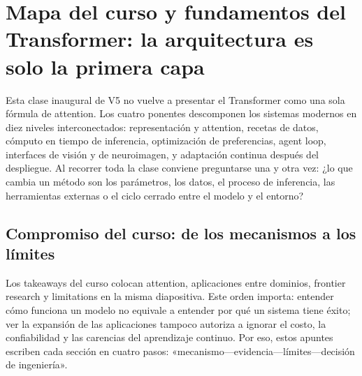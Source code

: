 \section{Mapa del curso y fundamentos del Transformer: la arquitectura es solo la primera capa}

Esta clase inaugural de V5 no vuelve a presentar el Transformer como una sola fórmula de attention. Los cuatro ponentes descomponen los sistemas modernos en diez niveles interconectados: representación y attention, recetas de datos, cómputo en tiempo de inferencia, optimización de preferencias, agent loop, interfaces de visión y de neuroimagen, y adaptación continua después del despliegue. Al recorrer toda la clase conviene preguntarse una y otra vez: ¿lo que cambia un método son los parámetros, los datos, el proceso de inferencia, las herramientas externas o el ciclo cerrado entre el modelo y el entorno?



\subsection{Compromiso del curso: de los mecanismos a los límites}

Los takeaways del curso colocan attention, aplicaciones entre dominios, frontier research y limitations en la misma diapositiva. Este orden importa: entender cómo funciona un modelo no equivale a entender por qué un sistema tiene éxito; ver la expansión de las aplicaciones tampoco autoriza a ignorar el costo, la confiabilidad y las carencias del aprendizaje continuo. Por eso, estos apuntes escriben cada sección en cuatro pasos: «mecanismo—evidencia—límites—decisión de ingeniería».





